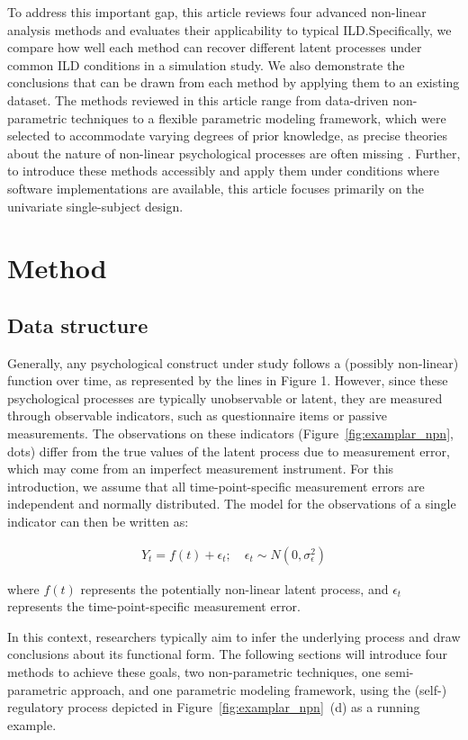 \documentclass[man, floatsintext]{apa7}
\begin{document}
To address this important gap, this article reviews four advanced non-linear
analysis
methods and evaluates their applicability to typical ILD.\@ Specifically, we
compare how well each method can recover different latent processes under
common ILD conditions in a simulation study. We also demonstrate the
conclusions that can be drawn from each method by applying them to an existing
dataset. The methods reviewed in this article range from data-driven
non-parametric techniques to a flexible parametric modeling framework, which
were selected to accommodate varying degrees of prior knowledge, as
precise theories about the nature of non-linear psychological processes are
often missing \parencite{tan_time-varying_2011}. Further, to introduce these
methods accessibly and apply them under conditions where software
implementations are available, this article focuses primarily on the univariate
single-subject design.

\section{Method}

\subsection{Data structure}

Generally, any psychological construct under study follows a (possibly
non-linear) function over time, as represented by the lines in Figure 1.
However, since these psychological processes are typically unobservable or
latent, they are measured through observable indicators, such as questionnaire
items or passive measurements. The observations on these indicators
(Figure~\ref{fig:examplar_npn}, dots)
differ from the true values of the latent process due to measurement
error, which may come from an imperfect measurement instrument.
For this introduction, we assume that all time-point-specific measurement
errors are independent and normally distributed. The model for the
observations of a single indicator can then be written as:

\begin{align}
  Y_t = f(t) + \epsilon_t; \quad \epsilon_t \sim N(0, \sigma^2_{\epsilon})
\end{align}

\noindent where $f(t)$ represents the potentially non-linear latent process,
and $\epsilon_t$ represents the time-point-specific measurement error.

In this context, researchers typically aim to infer the underlying process and
draw conclusions about its functional form. The following sections will
introduce four methods to achieve these goals, two non-parametric techniques,
one semi-parametric approach, and one parametric modeling framework, using the
(self-) regulatory process depicted in Figure~\ref{fig:examplar_npn}~(d)
as a running example.
\end{document}

